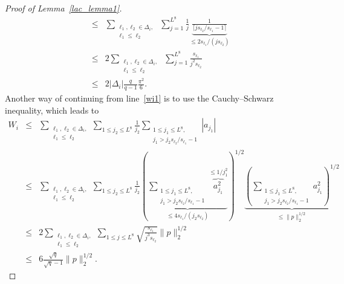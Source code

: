\documentclass[12pt]{amsart}
\begin{document}
\begin{proof}[Proof of Lemma~\ref{lac_lemma1}]
\begin{eqnarray}
& \leq & \sum_{\substack{\ell_1, \ell_2 \in \Delta_i,\\ \ell_1 \leq \ell_2}} ~\sum_{j=1}^{L^8} \frac{1}{j} \underbrace{\frac{1}{\lceil j s_{\ell_2} / s_{\ell_1} - 1 \rceil}}_{\leq 2 s_{\ell_1} / (j s_{\ell_2})} \nonumber\\
& \leq & 2 \sum_{\substack{\ell_1, \ell_2 \in \Delta_i,\\ \ell_1 \leq \ell_2}} ~\sum_{j=1}^{L^8} \frac{s_{\ell_1}}{j^2 s_{\ell_2}} \nonumber\\
& \leq & 2 |\Delta_i| \frac{q}{q-1} \frac{\pi^2}{6}.\label{wi2}
\end{eqnarray}
Another way of continuing from line~\eqref{wi1} is to use the Cauchy--Schwarz inequality, which leads to
\begin{eqnarray}
W_i & \leq & \sum_{\substack{\ell_1, \ell_2 \in \Delta_i,\\ \ell_1 \leq \ell_2}} \sum_{1 \leq j_2 \leq L^8} \frac{1}{j_2} \sum_{\substack{1 \leq j_1 \leq L^8, \\j_1 > j_2 s_{\ell_2} / s_{\ell_1} - 1}} |a_{j_1}| \nonumber\\
& \leq & \sum_{\substack{\ell_1, \ell_2 \in \Delta_i,\\ \ell_1 \leq \ell_2}}   \sum_{1 \leq j_2 \leq L^8} \frac{1}{j_2} \left(\underbrace{\sum_{\substack{1 \leq j_1 \leq L^8, \\j_1 > j_2 s_{\ell_2} / s_{\ell_1} - 1}}  \overbrace{a_{j_1}^2}^{\leq 1/j_1^2}}_{\leq 4 s_{\ell_1} /(j_2 s_{\ell_2})} \right)^{1/2} \underbrace{\left(\sum_{\substack{1 \leq j_1 \leq L^8, \\j_1 > j_2 s_{\ell_2} / s_{\ell_1} - 1}}  a_{j_1}^2\right)^{1/2}}_{\leq \|p\|_2^{1/2}} \nonumber\\
& \leq & 2 \sum_{\substack{\ell_1, \ell_2 \in \Delta_i,\\ \ell_1 \leq \ell_2}}   \sum_{1 \leq j \leq L^8} \sqrt{\frac{s_{\ell_1}}{j^3 s_{\ell_2}}} \|p\|_2^{1/2} \nonumber\\
& \leq & 6 \frac{\sqrt{q}}{\sqrt{q}-1} \|p\|_2^{1/2}. \label{wi3}
\end{eqnarray}


\end{proof}
\end{document}
